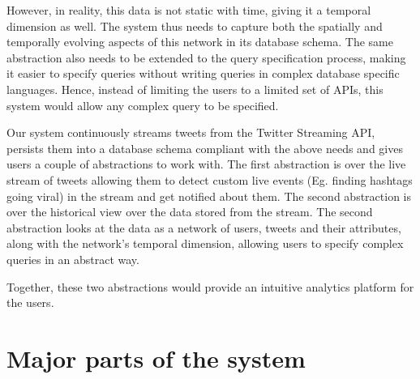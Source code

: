 \documentclass[letterpaper,10pt,english]{sphinxmanual}
\begin{document}
However, in reality, this data is not static with time, giving it a temporal dimension as well. The system thus needs to capture both the spatially and temporally evolving aspects of this network in its database schema. The same abstraction also needs to be extended to the query specification process, making it easier to specify queries without writing queries in complex database specific languages. Hence, instead of limiting the users to a limited set of APIs, this system would allow any complex query to be specified.

Our system continuously streams tweets from the Twitter Streaming API, persists them into a database schema compliant with the above needs and gives users a couple of abstractions to work with. The first abstraction is over the live stream of tweets allowing them to detect custom live events (Eg. finding hashtags going viral) in the stream and get notified about them. The second abstraction is over the historical view over the data stored from the stream. The second abstraction looks at the data as a network of users, tweets and their attributes, along with the network’s temporal dimension, allowing users to specify complex queries in an abstract way.

Together, these two abstractions would provide an intuitive analytics platform for the users.


\section{Major parts of the system}
\label{\detokenize{introduction:major-parts-of-the-system}}
\noindent{}
\end{document}
